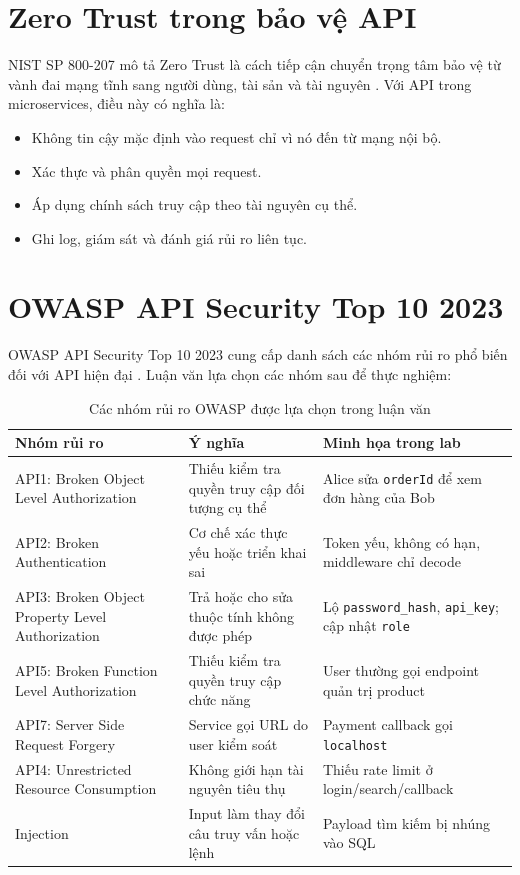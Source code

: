 \documentclass[14pt,a4paper]{extreport}
\begin{document}
\section{Zero Trust trong bảo vệ API}
NIST SP 800-207 mô tả Zero Trust là cách tiếp cận chuyển trọng tâm bảo vệ từ vành đai mạng tĩnh sang người dùng, tài sản và tài nguyên \cite{nist207}. Với API trong microservices, điều này có nghĩa là:
\begin{itemize}
  \item Không tin cậy mặc định vào request chỉ vì nó đến từ mạng nội bộ.
  \item Xác thực và phân quyền mọi request.
  \item Áp dụng chính sách truy cập theo tài nguyên cụ thể.
  \item Ghi log, giám sát và đánh giá rủi ro liên tục.
\end{itemize}

\section{OWASP API Security Top 10 2023}
OWASP API Security Top 10 2023 cung cấp danh sách các nhóm rủi ro phổ biến đối với API hiện đại \cite{owasptop10}. Luận văn lựa chọn các nhóm sau để thực nghiệm:

\begin{longtable}{p{4.2cm}p{5cm}p{5cm}}
\caption{Các nhóm rủi ro OWASP được lựa chọn trong luận văn}\\
\toprule
\textbf{Nhóm rủi ro} & \textbf{Ý nghĩa} & \textbf{Minh họa trong lab}\\
\midrule
API1: Broken Object Level Authorization & Thiếu kiểm tra quyền truy cập đối tượng cụ thể & Alice sửa \texttt{orderId} để xem đơn hàng của Bob\\
API2: Broken Authentication & Cơ chế xác thực yếu hoặc triển khai sai & Token yếu, không có hạn, middleware chỉ decode\\
API3: Broken Object Property Level Authorization & Trả hoặc cho sửa thuộc tính không được phép & Lộ \texttt{password\_hash}, \texttt{api\_key}; cập nhật \texttt{role}\\
API5: Broken Function Level Authorization & Thiếu kiểm tra quyền truy cập chức năng & User thường gọi endpoint quản trị product\\
API7: Server Side Request Forgery & Service gọi URL do user kiểm soát & Payment callback gọi \texttt{localhost}\\
API4: Unrestricted Resource Consumption & Không giới hạn tài nguyên tiêu thụ & Thiếu rate limit ở login/search/callback\\
Injection & Input làm thay đổi câu truy vấn hoặc lệnh & Payload tìm kiếm bị nhúng vào SQL\\
\bottomrule
\end{longtable}
\end{document}
